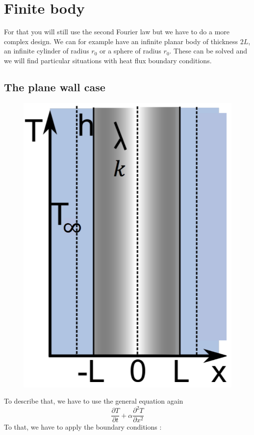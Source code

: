 \section{Finite body}
	For that you will still use the second Fourier law but we have to do a more complex design. We can for example have an infinite planar body of thickness $2L$, an infinite cylinder of radius $r_0$ or a sphere of radius $r_0$. These can be solved and we will find particular situations with heat flux boundary conditions. 
	
	\subsection{The plane wall case}
		\begin{figure}
		\vspace{-8mm}
		\includegraphics[scale=0.2]{ch4/6}
		\end{figure}	
		To describe that, we have to use the general equation again 
		\begin{equation}
			\frac{\partial T}{\partial t} + \alpha \frac{\partial ^2 T}{\partial x^2 }
		\end{equation}		 
	 	To that, we have to apply the boundary conditions :\\
	 	
